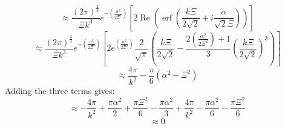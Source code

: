\documentclass[letterpaper,twocolumn,amsmath,amssymb,prb]{revtex4-1}
\begin{document}
\begin{widetext}
\begin{displaymath}{\approx\frac{\left(2\pi\right)^\frac{2}{3}}{\Xi{k}^3}e^{-\left(\frac{\alpha^2}{2\Xi^2}\right)}\left[2\operatorname{Re}\left(\operatorname{erf}\left(\frac{k\Xi}{2\sqrt{2}}+i\frac{\alpha}{\sqrt{2}\Xi}\right)\right)\right]}\end{displaymath} 
\begin{displaymath}{\approx\frac{\left(2\pi\right)^\frac{2}{3}}{\Xi{k}^3}e^{-\left(\frac{\alpha^2}{2\Xi^2}\right)}\left[2e^{\left(\frac{\alpha^2}{2\Xi^2}\right)}\frac{2}{\sqrt{\pi}}   \left(\frac{k\Xi}{2\sqrt{2}}   -\frac{2\left(\frac{\alpha^2}{2\Xi^2}\right)+1}{3}\left(\frac{k\Xi}{2\sqrt{2}}\right)^3\right)\right]}\end{displaymath}
\begin{displaymath}{\approx\frac{4\pi}{k^2}-\frac{\pi}{6}\left(\alpha^2-\Xi^2\right)}\end{displaymath}  
\color{black}
Adding the three terms gives:
\begin{displaymath}{\approx-\frac{4\pi}{k^2}+\frac{\pi\alpha^2}{2}+\frac{\pi\Xi^2}{6}-\frac{\pi\alpha^2}{3}+\frac{4\pi}{k^2}-\frac{\pi\alpha^2}{6}-\frac{\pi\Xi^2}{6}}\end{displaymath} 
\begin{displaymath}{\approx0}\end{displaymath} 
\[{}\]



\end{widetext}
\end{document}
